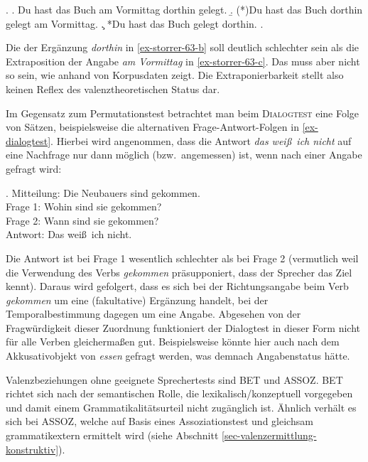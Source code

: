 \ex. 
\a. Du hast das Buch am Vormittag dorthin gelegt.
\b. (*)Du hast das Buch dorthin gelegt am Vormittag.\label{ex-storrer-63-b}
\c. *Du hast das Buch gelegt dorthin.\label{ex-storrer-63-c}
\z. \citep[63]{Storrer:92}

Die  der Ergänzung {\it dorthin} in \ref{ex-storrer-63-b} soll deutlich schlechter sein als die Extraposition der Angabe {\it am Vormittag} in \ref{ex-storrer-63-c}. Das muss aber nicht so sein, wie \citet[Abschnitt~13.1.1]{Mueller:99} anhand von Korpusdaten zeigt. Die Extraponierbarkeit stellt also keinen Reflex des valenztheoretischen Status dar.

Im Gegensatz zum Permutationstest betrachtet man beim \textsc{Dialogtest} eine Folge von Sätzen, beispielsweise die alternativen Frage-Antwort-Folgen in \ref{ex-dialogtest}. Hierbei wird angenommen, dass die Antwort \textit{das wei\ss \ ich nicht} auf eine Nachfrage nur dann möglich (bzw.\ angemessen) ist, wenn nach einer Angabe gefragt wird:

\ex.\label{ex-dialogtest}
Mitteilung: Die Neubauers sind gekommen. \\
Frage 1: Wohin sind sie gekommen? \\
Frage 2: Wann sind sie gekommen? \\
Antwort: Das wei\ss \ ich nicht. \\
\citep[68]{Storrer:92}

Die Antwort ist bei Frage 1 wesentlich schlechter als bei Frage 2 (vermutlich weil die Verwendung des Verbs \textit{gekommen} präsupponiert, dass der Sprecher das Ziel kennt). Daraus wird gefolgert, dass es sich bei der Richtungsangabe beim Verb {\it gekommen} um eine (fakultative) Ergänzung handelt, bei der Temporalbestimmung dagegen um eine Angabe. Abgesehen von der Fragwürdigkeit dieser Zuordnung funktioniert der Dialogtest in dieser Form nicht für alle Verben gleichermaßen gut. Beispielsweise könnte hier auch nach dem Akkusativobjekt von \textit{essen} gefragt werden, was demnach Angabenstatus hätte.  %


Valenzbeziehungen ohne geeignete Sprechertests sind BET und ASSOZ. BET richtet sich nach der semantischen Rolle, die lexikalisch/konzeptuell vorgegeben und damit einem Grammatikalitätsurteil nicht zugänglich ist. Ähnlich verhält es sich bei ASSOZ, welche auf Basis eines Assoziationstest und gleichsam grammatikextern ermittelt wird (siehe Abschnitt \ref{sec-valenzermittlung-konstruktiv}).

